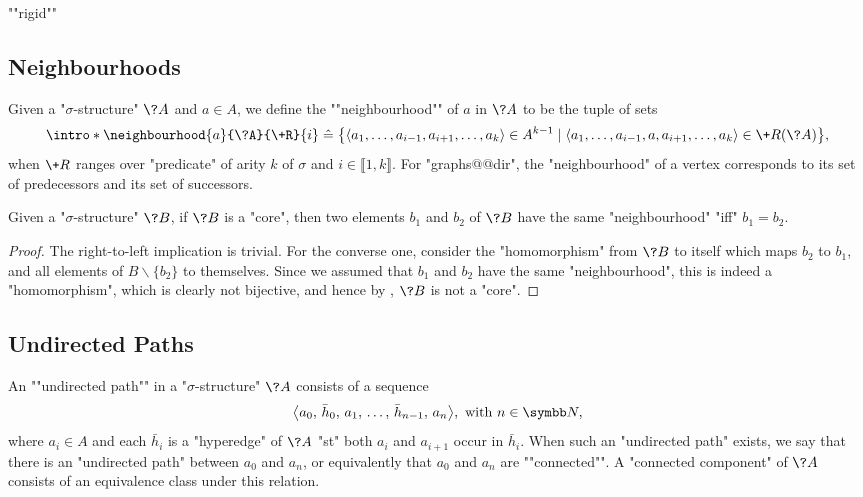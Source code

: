 \begin{itemize}
	\itemAP ""rigid""
\end{itemize}

\subsection{Neighbourhoods}

Given a "$\sigma$-structure" $\?A$ and $a \in A$, we define the \AP""neighbourhood"" of $a$
in $\?A$
to be the tuple of sets
\[
	\intro*\neighbourhood{a}{\?A}{\+R}{i} \defeq
		\big\{
			\langle a_1, \hdots, a_{i-1}, a_{i+1}, \hdots, a_k \rangle \in A^{k-1} \mid
			\langle a_1, \hdots, a_{i-1}, a, a_{i+1}, \hdots, a_k \rangle \in \+R(\?A)
		\big\},
\]
when $\+R$ ranges over "predicate" of arity $k$ of $\sigma$ and $i \in \lBrack 1,k\rBrack$. 
For "graphs@@dir", the "neighbourhood" of a vertex corresponds to its set of predecessors and
its set of successors.

\begin{proposition}
	\AP\label{prop:neighbourhood-core}
	Given a "$\sigma$-structure" $\?B$, if $\?B$ is a "core", then
	two elements $b_1$ and $b_2$ of $\?B$ have the same "neighbourhood" "iff" $b_1 = b_2$.
\end{proposition}

\begin{proof}
	The right-to-left implication is trivial.
	For the converse one, consider the "homomorphism" from $\?B$ to itself
	which maps $b_2$ to $b_1$, and all elements of $B \smallsetminus \{b_2\}$
	to themselves. Since we assumed that $b_1$ and $b_2$ have the same "neighbourhood",
	this is indeed a "homomorphism", which is clearly not bijective, and
	hence by , $\?B$ is not a "core".
\end{proof}

\subsection{Undirected Paths}

An \AP""undirected path"" in a "$\sigma$-structure" $\?A$ consists of a sequence
\[\big\langle a_0,\, \bar h_0,\, a_1,\, \hdots,\, \bar h_{n-1},\, a_n\big\rangle, \text{ with } n \in \N,\]
where $a_i \in A$ and each $\bar h_i$ is a "hyperedge" of $\?A$ "st" both
$a_i$ and $a_{i+1}$ occur in $\bar h_i$. When such an "undirected path" exists, we say that
there is an "undirected path" between $a_0$ and $a_n$, or equivalently
that $a_0$ and $a_n$ are \AP""connected"".%
A \AP"connected component" of $\?A$ consists of an equivalence class under this relation.

